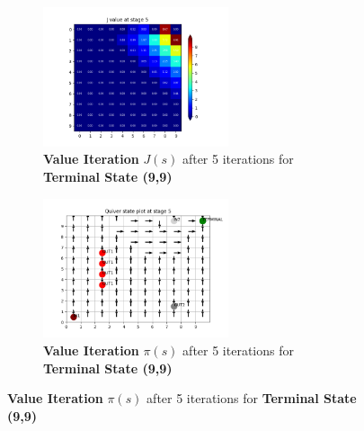 \begin{figure}[h]
\begin{subfigure}
\centering
\includegraphics[angle=0,width=0.6\textwidth]{hw4/logs/value_iter_t=99_N=20/J-heatmap-5.png}
\caption{ \textbf{Value Iteration} $J(s)$  after 5 iterations for \textbf{Terminal State (9,9)}}
\end{subfigure}

\begin{subfigure}
\centering
\includegraphics[angle=0,width=0.6\textwidth]{hw4/logs/value_iter_t=99_N=20/quiver-5.png}
\caption{ \textbf{Value Iteration}  $\pi(s)$ after 5 iterations for \textbf{Terminal State (9,9)}}
\end{subfigure}
\end{figure}
